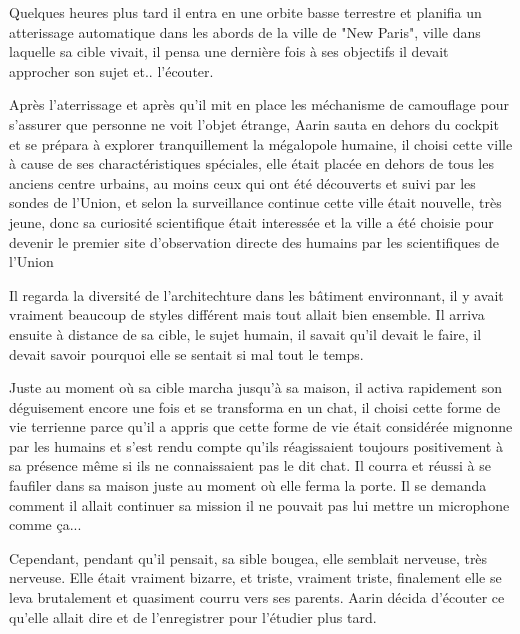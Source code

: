 \documentclass[12pt,hidelinks,a4paper]{book}
\begin{document}
Quelques heures plus tard il entra en une orbite basse terrestre et planifia un atterissage automatique dans les 
abords de la ville de "New Paris", ville dans laquelle sa cible vivait, il pensa une dernière fois à ses objectifs
il devait approcher son sujet et.. l'écouter.\par 
\bigskip

Après l'aterrissage et après qu'il mit en place les méchanisme de camouflage pour s'assurer que personne ne voit 
l'objet étrange, Aarin sauta en dehors du cockpit et se prépara à explorer tranquillement la mégalopole humaine,
il choisi cette ville à cause de ses charactéristiques spéciales, elle était placée en dehors de tous les anciens 
centre urbains, au moins ceux qui ont été découverts et suivi par les sondes de l'Union, et selon la 
surveillance continue cette ville était nouvelle, très jeune, donc sa curiosité scientifique était interessée
et la ville a été choisie pour devenir le premier site d'observation directe des humains par les scientifiques de l'Union\par 
\bigskip

Il regarda la diversité de l'architechture dans les bâtiment environnant, il y avait vraiment beaucoup de styles 
différent mais tout allait bien ensemble. Il arriva ensuite à distance de sa cible, le sujet humain, 
il savait qu'il devait le faire, il devait savoir pourquoi elle se sentait si mal tout le temps.\par 
\bigskip

Juste au moment où sa cible marcha jusqu'à sa maison, il activa rapidement son déguisement encore une fois et 
se transforma en un chat, il choisi cette forme de vie terrienne parce qu'il a appris que cette forme de vie était 
considérée mignonne par les humains et s'est rendu compte qu'ils réagissaient toujours positivement à sa présence même si ils 
ne connaissaient pas le dit chat. Il courra et réussi à se faufiler dans sa maison juste au moment où elle ferma la porte.
Il se demanda comment il allait continuer sa mission il ne pouvait pas lui mettre un microphone comme ça...\par 
\bigskip

Cependant, pendant qu'il pensait, sa sible bougea, elle semblait nerveuse, très nerveuse.
Elle était vraiment bizarre, et triste, vraiment triste, finalement elle se leva brutalement 
et quasiment courru vers ses parents. Aarin décida d'écouter ce qu'elle allait dire et de l'enregistrer pour 
l'étudier plus tard.\par 
\bigskip
\end{document}
